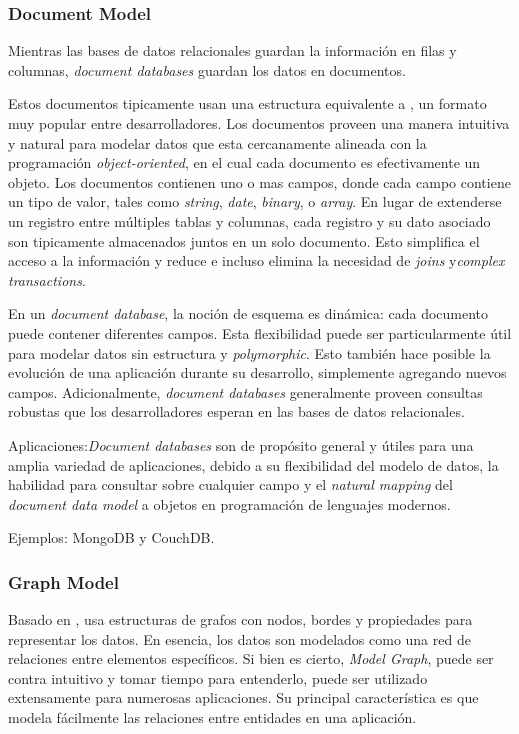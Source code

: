 \subsubsection{Document Model}\label{cap:justificacion_proyecto:base_datos:nosql:document_model}

 Mientras las bases de datos relacionales guardan la información en filas y columnas, \textit{document databases} guardan los datos en documentos.  

Estos documentos tipicamente usan una estructura equivalente a , un formato muy popular entre desarrolladores. Los documentos proveen una manera intuitiva y natural para modelar datos que esta cercanamente alineada con la programación \textit{object-oriented}, en el cual cada documento es efectivamente un objeto. Los documentos contienen uno o mas campos, donde cada campo contiene un tipo de valor, tales como \textit{string}, \textit{date}, \textit{binary}, o \textit{array}. En lugar de extenderse un registro entre múltiples tablas y columnas, cada registro y su dato asociado son tipicamente almacenados juntos en un solo documento. Esto simplifica el acceso a la información y reduce e incluso elimina la necesidad de \textit{joins} y\textit{complex transactions}.

En un \textit{document database}, la noción de esquema es dinámica: cada documento puede contener diferentes campos. Esta flexibilidad puede ser particularmente útil para modelar datos sin estructura y \textit{polymorphic}. Esto también hace posible la evolución de una aplicación durante su desarrollo, simplemente agregando nuevos campos. Adicionalmente, \textit{document databases} generalmente proveen consultas robustas que los desarrolladores esperan en las bases de datos relacionales.

Aplicaciones:\textit{Document databases} son de propósito general y útiles para una amplia variedad de aplicaciones, debido a su flexibilidad del modelo de datos, la habilidad para consultar sobre cualquier campo y el \textit{natural mapping} del \textit{document data model} a objetos en programación de lenguajes modernos.

Ejemplos: MongoDB y CouchDB.

\subsubsection{Graph Model}
\label{cap:justificacion_proyecto:base_datos:nosql:graph_model}

Basado en , usa estructuras de grafos con nodos, bordes y propiedades para representar los datos. En esencia, los datos son modelados como una red de relaciones entre elementos específicos. Si bien es cierto, \textit{Model Graph}, puede ser contra intuitivo y tomar tiempo para entenderlo, puede ser utilizado extensamente para numerosas aplicaciones. Su principal característica es que modela fácilmente las relaciones entre entidades en una aplicación.

